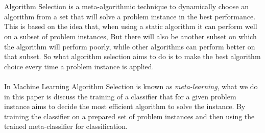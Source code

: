 \\\\
Algorithm Selection is a meta-algorithmic technique to dynamically choose an algorithm from a set that will solve a problem instance in the best performance. This is based on the idea that, when using a static algorithm it can perform well on a subset of problem instances, But there will also be another subset on which the algorithm will perform poorly, while other algorithms can perform better on that subset. So what algorithm selection aims to do is to make the best algorithm choice every time a problem instance is applied.
\\\\
In Machine Learning Algorithm Selection is known as \textit{meta-learning}, what we do in this paper is discuss the training of a classifier that for a given problem instance aims to decide the most efficient algorithm to solve the instance. By training the classifier on a prepared set of problem instances and then using the trained meta-classifier for classification.  
